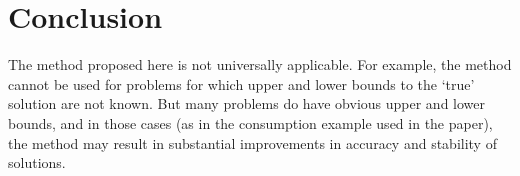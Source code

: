 \documentclass[titlepage,abstract]{\econtex}
\begin{document}
\section{Conclusion}

The method proposed here is not universally applicable.  For example,
the method cannot be used for problems for which upper and lower
bounds to the `true' solution are not known.  But many problems do 
have obvious upper and lower bounds, and in those cases (as in the 
consumption example used in the paper), the method may result in 
substantial improvements in accuracy and stability of solutions.



\vfill\clearpage


\end{document}
